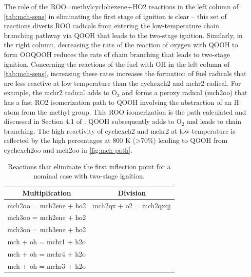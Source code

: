\documentclass[12pt, letterpaper]{article}
\begin{document}
The role of the ROO=methylcyclohexene+HO2 reactions in the left column of 
\autoref{tab:mch-sens} in eliminating the first stage of ignition is clear -- 
this set of reactions diverts ROO radicals from entering the low-temperature 
chain branching pathway via QOOH that leads to the two-stage ignition. 
Similarly, in the right column, decreasing the rate of the reaction of oxygen 
with QOOH to form OOQOOH reduces the rate of chain branching that leads to 
two-stage ignition. Concerning the reactions of the fuel with OH in the left 
column of \autoref{tab:mch-sens}, increasing these rates increases the 
formation of fuel radicals that are less reactive at low temperature than the 
cychexch2 and mchr2 radical. For example, the mchr2 radical adds to O$_2$ and 
forms a peroxy radical (mch2oo) that has a fast RO2 isomerization path to QOOH 
involving the abstraction of an H atom from the methyl group. This ROO 
isomerization is the path calculated and discussed in Section 4.1 of 
\cite{Weber2014}. QOOH subsequently adds to O$_2$ and leads to chain branching. 
The high reactivity of cychexch2 and mchr2 at low temperature is reflected by 
the high percentages at 800 K (>70\%) leading to QOOH from cychexch2oo and 
mch2oo in \autoref{fig:mch-path}.

\begin{table}
    \centering
    \caption{Reactions that eliminate the first inflection point for a nominal 
    case with two-stage ignition.}
    \label{tab:mch-sens}
    \begin{tabular}{c c}
    \toprule
    Multiplication & Division \\
    \midrule
    mch2oo = mch2ene + ho2 & mch2qx + o2 = mch2qxqj \\
    mch3oo = mch2ene + ho2 & \\
    mch3oo = mch3ene + ho2 & \\
    mch + oh = mchr1 + h2o & \\
    mch + oh = mchr4 + h2o & \\
    mch + oh = mchr3 + h2o & \\
    \bottomrule
    \end{tabular}
\end{table}
    
\end{document}
